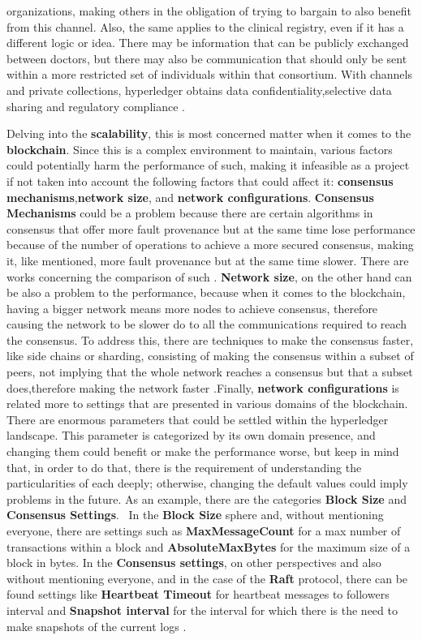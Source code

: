 organizations, making others in the obligation of trying to bargain to also benefit from this channel. Also, the same applies to the clinical registry, even if it has a different logic or idea. There may be information that can be publicly exchanged between doctors, but there may also be communication that should only be sent within a more restricted set of individuals within that consortium. With channels and private collections, hyperledger obtains data confidentiality,selective data sharing and regulatory compliance \cite{private-collections}. 

Delving into the \textbf{scalability}, this is most concerned matter when it comes to the \textbf{blockchain}. Since this is a complex environment to maintain, various factors could potentially harm the performance of such, making it infeasible as a project if not taken into account the following factors that could affect it: \textbf{consensus mechanisms},\textbf{network size}, and \textbf{network configurations}. \textbf{Consensus Mechanisms} could be a problem because there are certain algorithms in consensus that offer more fault provenance but at the same time lose performance because of the number of operations to achieve a more secured consensus, making it, like mentioned, more fault provenance but at the same time slower. There are works concerning the comparison of such \cite{consensus-performance}. \textbf{Network size}, on the other hand can be also a problem to the performance, because when it comes to the blockchain, having a bigger network means more nodes to achieve consensus, therefore causing the network to be slower do to all the communications required to reach the consensus. To address this, there are techniques to make the consensus faster, like side chains or sharding, consisting of making the consensus within a subset of peers, not implying that the whole network reaches a consensus but that a subset does,therefore making the network faster \cite{sharding}\cite{side-chains}.Finally, \textbf{network configurations} is related more to settings that are presented in various domains of the blockchain. There are enormous parameters that could be settled within the hyperledger landscape. This parameter is categorized by its own domain presence, and changing them could benefit or make the performance worse, but keep in mind that, in order to do that, there is the requirement of understanding the particularities of each deeply; otherwise, changing the default values could imply problems in the future. As an example, there are the categories \textbf{Block Size} and \textbf{Consensus Settings}.  In the \textbf{Block Size} sphere and, without mentioning everyone, there are settings such as \textbf{MaxMessageCount} for a max number of transactions within a block and \textbf{AbsoluteMaxBytes} for the maximum size of a block in bytes. In the \textbf{Consensus settings}, on other perspectives and also without mentioning everyone, and in the case of the \textbf{Raft} protocol, there can be found settings like \textbf{Heartbeat Timeout} for heartbeat messages to followers interval and \textbf{Snapshot interval} for the interval for which there is the need to make snapshots of the current logs \cite{changing-hlf-settings}.

